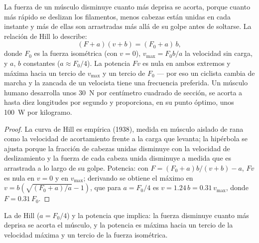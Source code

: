 \begin{theorem}\label{thm:b2:muscle-movement:hill}
La fuerza de un músculo disminuye cuanto más deprisa se acorta, porque
cuanto más rápido se deslizan los filamentos, menos cabezas están unidas
en cada instante y más de ellas son arrastradas más allá de su golpe antes
de soltarse. La relación de Hill lo describe:
\[
(F + a)(v + b) = (F_0 + a)\,b,
\]
donde $F_0$ es la fuerza isométrica (con $v = 0$), $v_{\max} =
F_0 b/a$ la velocidad sin carga, y $a$, $b$ constantes ($a \approx
F_0/4$). La potencia $Fv$ es nula en ambos extremos y máxima hacia un
tercio de $v_{\max}$ y un tercio de $F_0$ --- por eso un ciclista cambia
de marcha y la zancada de un velocista tiene una frecuencia preferida. Un
músculo humano desarrolla unos \qty{30}{N} por centímetro cuadrado de
sección, se acorta a hasta diez longitudes por segundo y proporciona, en
su punto óptimo, unos \qty{100}{W} por kilogramo.
\end{theorem}
\begin{proof}
La curva de Hill es empírica (1938), medida en músculo aislado de rana
como la velocidad de acortamiento frente a la carga que levanta; la
hipérbola se ajusta porque la fracción de cabezas unidas disminuye con la
velocidad de deslizamiento y la fuerza de cada cabeza unida disminuye a
medida que es arrastrada a lo largo de su golpe. Potencia: con
$F = (F_0 + a)b/(v + b) - a$, $Fv$ es nula en
$v = 0$ y en $v_{\max}$; derivando se obtiene el máximo en
$v = b(\sqrt{(F_0 + a)/a} - 1)$, que para $a = F_0/4$ es $v =
1.24\,b = 0.31\,v_{\max}$, donde $F = 0.31\,F_0$.
\end{proof}

\begin{omfigure}

{\small La  de Hill ($a = F_0/4$) y la potencia que
implica: la fuerza disminuye cuanto más deprisa se acorta el músculo, y la
potencia es máxima hacia un tercio de la velocidad máxima y un tercio de la
fuerza isométrica.}
\end{omfigure}

